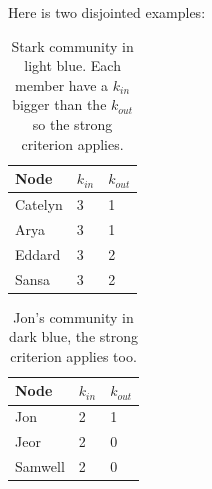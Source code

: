 \documentclass[10pt,a4paper]{article}
\begin{document}
\begin{enumerate}
Here is two disjointed examples: 

\begin{table}[H]
	\centering
	\caption{Stark community in \textcolor{spirodiscoball}{light blue}. Each member have a $k_{in}$ bigger than the $k_{out}$ so the strong criterion applies. }
	\label{my-asdf}
	\begin{tabular}{|l|l|l|}
		\hline
		\textbf{Node}    & $k_{in}$ & $k_{out}$ \\ \hline
		Catelyn & 3        & 1         \\ \hline
		Arya    & 3        & 1         \\ \hline
		Eddard  & 3        & 2         \\ \hline
		Sansa   & 3        & 2         \\ \hline
	\end{tabular}
\end{table}

\begin{table}[H]
	\centering
	\caption{Jon's community in \textcolor{smalt}{dark blue}, the strong criterion applies too. }
	\label{my-label}
	\begin{tabular}{|l|l|l|}
		\hline
		Node    & $k_{in}$ & $k_{out}$ \\ \hline
		Jon     & 2        & 1         \\ \hline
		Jeor    & 2        & 0         \\ \hline
		Samwell & 2        & 0         \\ \hline
	\end{tabular}
\end{table}

\end{enumerate}
\end{document}

